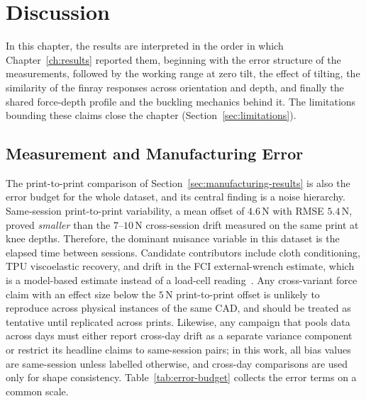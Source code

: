 \chapter{\rm\bfseries Discussion}
\label{ch:discussion}

In this chapter, the results are interpreted in the order in which
Chapter~\ref{ch:results} reported them, beginning with the error
structure of the measurements, followed by the working range at zero
tilt, the effect of tilting, the similarity of the finray responses
across orientation and depth, and finally the shared force-depth profile
and the buckling mechanics behind it. The limitations bounding these
claims close the chapter (Section~\ref{sec:limitations}).

\section{Measurement and Manufacturing Error}
\label{sec:error-discussion}
\label{sec:manufacturing-mechanism}

The print-to-print comparison of Section~\ref{sec:manufacturing-results}
is also the error budget for the whole dataset, and its central
finding is a noise hierarchy. Same-session print-to-print variability,
a mean offset of $4.6$\,N with RMSE $5.4$\,N, proved \emph{smaller}
than the $7$--$10$\,N cross-session drift measured on the same print
at knee depths. Therefore, the dominant nuisance variable in this
dataset is the elapsed time between sessions.
Candidate contributors include cloth conditioning, TPU
viscoelastic recovery, and drift in the FCI external-wrench estimate,
which is a model-based estimate instead of a load-cell
reading~\cite{petrea2021interaction}. Any
cross-variant force claim with an effect size below the $5$\,N
print-to-print offset is unlikely to reproduce across physical
instances of the same CAD, and should be treated as tentative until
replicated across prints. Likewise, any campaign that pools data across days
must either report cross-day drift as a separate variance component or
restrict its headline claims to same-session pairs; in this work,
all bias values are same-session unless labelled otherwise, and
cross-day comparisons are used only for shape consistency.
Table~\ref{tab:error-budget} collects the error terms on a common
scale.

